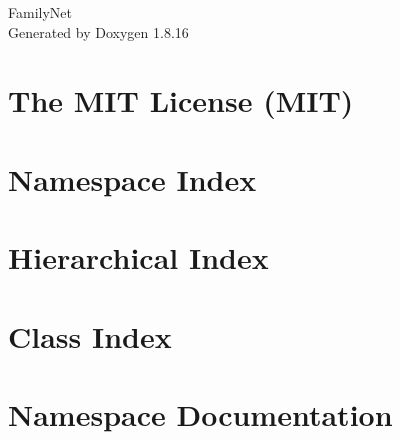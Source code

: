 \let\mypdfximage\pdfximage\def\pdfximage{\immediate\mypdfximage}\documentclass[twoside]{book}
\newcommand{\+}{\discretionary{\mbox{\scriptsize$\hookleftarrow$}}{}{}}
\newcommand{\clearemptydoublepage}{%
  \newpage{\pagestyle{empty}\cleardoublepage}%
}
\begin{document}
\hypersetup{pageanchor=false,
             bookmarksnumbered=true,
             pdfencoding=unicode
            }
\begin{titlepage}
\vspace*{7cm}
\begin{center}%
{\Large Family\+Net }\\
\vspace*{1cm}
{\large Generated by Doxygen 1.8.16}\\
\end{center}
\end{titlepage}
\clearemptydoublepage
{}
\tableofcontents
\clearemptydoublepage
{}
\hypersetup{pageanchor=true}

\chapter{The M\+IT License (M\+IT)}
\label{md__d_1_ss__family_net2__family_net__family_net__family_net_wwwroot_lib_jquery-validation__l_i_c_e_n_s_e}

\chapter{Namespace Index}

\chapter{Hierarchical Index}

\chapter{Class Index}

\chapter{Namespace Documentation}











\end{document}
